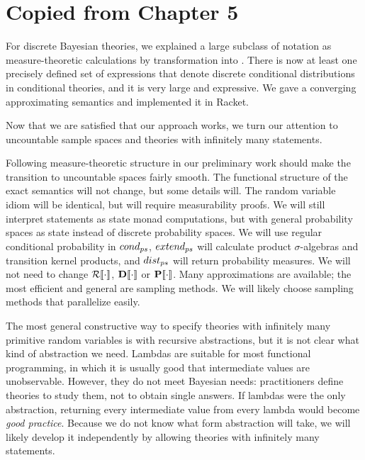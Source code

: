 \section{Copied from Chapter 5}

For discrete Bayesian theories, we explained a large subclass of notation as measure-theoretic calculations by transformation into \targetlang. There is now at least one precisely defined set of expressions that denote discrete conditional distributions in conditional theories, and it is very large and expressive. We gave a converging approximating semantics and implemented it in Racket.


Now that we are satisfied that our approach works, we turn our attention to uncountable sample spaces and theories with infinitely many statements.

Following measure-theoretic structure in our preliminary work should make the transition to uncountable spaces fairly smooth. The functional structure of the exact semantics will not change, but some details will. The random variable idiom will be identical, but will require measurability proofs. We will still interpret statements as state monad computations, but with general probability spaces as state instead of discrete probability spaces. We will use regular conditional probability in $cond_{ps}$, $extend_{ps}$ will calculate product $\sigma$-algebras and transition kernel products, and $dist_{ps}$ will return probability measures. We will not need to change $\mathcal{R}\!\left\llbracket{\cdot}\right\rrbracket$, $\mathbf{D}\!\left\llbracket{\cdot}\right\rrbracket$ or $\mathbf{P}\!\left\llbracket{\cdot}\right\rrbracket$. Many approximations are available; the most efficient and general are sampling methods. We will likely choose sampling methods that parallelize easily.

The most general constructive way to specify theories with infinitely many primitive random variables is with recursive abstractions, but it is not clear what kind of abstraction we need. Lambdas are suitable for most functional programming, in which it is usually good that intermediate values are unobservable. However, they do not meet Bayesian needs: practitioners define theories to study them, not to obtain single answers. If lambdas were the only abstraction, returning every intermediate value from every lambda would become \textit{good practice}. Because we do not know what form abstraction will take, we will likely develop it independently by allowing theories with infinitely many statements.

